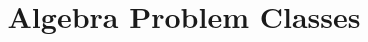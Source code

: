 \documentclass[a4paper, answers]{exam}
\title{Algebra Problem Classes}
\author{}
\begin{document}
    \maketitle
    \begin{questions}
%       
        
    \end{questions}
\end{document}
